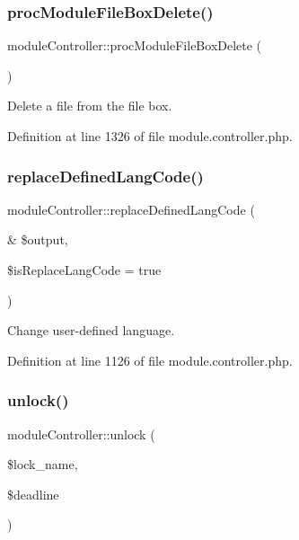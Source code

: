 \subsubsection{\texorpdfstring{proc\+Module\+File\+Box\+Delete()}{procModuleFileBoxDelete()}}
{\footnotesize\ttfamily module\+Controller\+::proc\+Module\+File\+Box\+Delete (\begin{DoxyParamCaption}{ }\end{DoxyParamCaption})}



Delete a file from the file box. 



Definition at line 1326 of file module.\+controller.\+php.

\mbox{\label{classmoduleController_ace764298e1aee4006ecd8dbf7aaf4007}} 
\subsubsection{\texorpdfstring{replace\+Defined\+Lang\+Code()}{replaceDefinedLangCode()}}
{\footnotesize\ttfamily module\+Controller\+::replace\+Defined\+Lang\+Code (\begin{DoxyParamCaption}\item[{\&}]{\$output,  }\item[{}]{\$is\+Replace\+Lang\+Code = {\ttfamily true} }\end{DoxyParamCaption})}



Change user-\/defined language. 



Definition at line 1126 of file module.\+controller.\+php.

\mbox{\label{classmoduleController_a79a5d8ecb0bc6186756e80144cbca92f}} 
\subsubsection{\texorpdfstring{unlock()}{unlock()}}
{\footnotesize\ttfamily module\+Controller\+::unlock (\begin{DoxyParamCaption}\item[{}]{\$lock\+\_\+name,  }\item[{}]{\$deadline }\end{DoxyParamCaption})}



